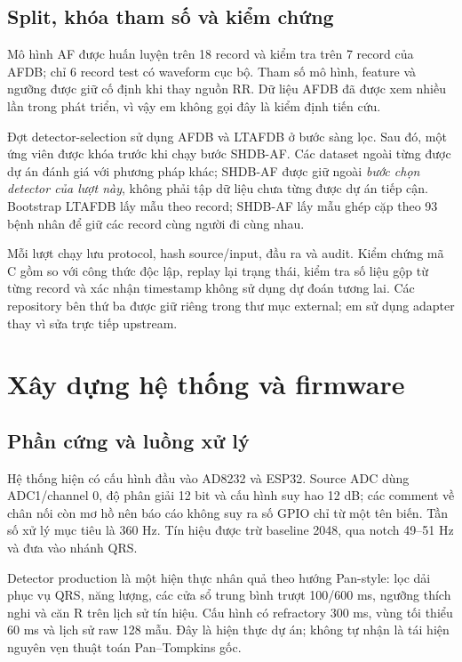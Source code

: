 \documentclass[12pt,a4paper,oneside]{report}
\begin{document}
\section{Split, khóa tham số và kiểm chứng}
Mô hình AF được huấn luyện trên 18 record và kiểm tra trên 7 record của AFDB; chỉ 6 record test có waveform cục bộ. Tham số mô hình, feature và ngưỡng được giữ cố định khi thay nguồn RR. Dữ liệu AFDB đã được xem nhiều lần trong phát triển, vì vậy em không gọi đây là kiểm định tiến cứu.

Đợt detector-selection sử dụng AFDB và LTAFDB ở bước sàng lọc. Sau đó, một ứng viên được khóa trước khi chạy bước SHDB-AF. Các dataset ngoài từng được dự án đánh giá với phương pháp khác; SHDB-AF được giữ ngoài \emph{bước chọn detector của lượt này}, không phải tập dữ liệu chưa từng được dự án tiếp cận. Bootstrap LTAFDB lấy mẫu theo record; SHDB-AF lấy mẫu ghép cặp theo 93 bệnh nhân để giữ các record cùng người đi cùng nhau.

Mỗi lượt chạy lưu protocol, hash source/input, đầu ra và audit. Kiểm chứng mã C gồm so với công thức độc lập, replay lại trạng thái, kiểm tra số liệu gộp từ từng record và xác nhận timestamp không sử dụng dự đoán tương lai. Các repository bên thứ ba được giữ riêng trong thư mục external; em sử dụng adapter thay vì sửa trực tiếp upstream.

\chapter{Xây dựng hệ thống và firmware}
\section{Phần cứng và luồng xử lý}
Hệ thống hiện có cấu hình đầu vào AD8232 và ESP32. Source ADC dùng ADC1/channel 0, độ phân giải 12 bit và cấu hình suy hao 12 dB; các comment về chân nối còn mơ hồ nên báo cáo không suy ra số GPIO chỉ từ một tên biến. Tần số xử lý mục tiêu là 360 Hz. Tín hiệu được trừ baseline 2048, qua notch 49--51 Hz và đưa vào nhánh QRS.

Detector production là một hiện thực nhân quả theo hướng Pan-style: lọc dải phục vụ QRS, năng lượng, các cửa sổ trung bình trượt 100/600 ms, ngưỡng thích nghi và căn R trên lịch sử tín hiệu. Cấu hình có refractory 300 ms, vùng tối thiểu 60 ms và lịch sử raw 128 mẫu. Đây là hiện thực dự án; không tự nhận là tái hiện nguyên vẹn thuật toán Pan--Tompkins gốc.
\end{document}
